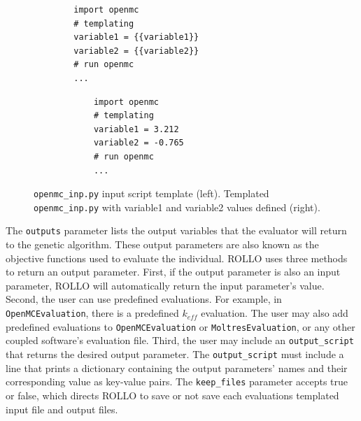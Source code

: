 \begin{figure}[]
    \begin{minipage}{0.4\textwidth}
        \centering
    \begin{verbatim}
        import openmc 
        # templating 
        variable1 = {{variable1}}
        variable2 = {{variable2}}
        # run openmc 
        ... 
    \end{verbatim}
    \end{minipage}
    \hspace{2cm}
    \begin{minipage}{0.4\textwidth}
        \centering
        \begin{verbatim}
            import openmc 
            # templating 
            variable1 = 3.212
            variable2 = -0.765
            # run openmc 
            ... 
        \end{verbatim}
        \end{minipage}
    \caption{\texttt{openmc\_inp.py} input script template (left). 
             Templated \texttt{openmc\_inp.py} with variable1 and variable2 
             values defined (right).}
    \label{fig:openmcinp.py}
\end{figure}

The \texttt{outputs} parameter lists the output variables that the evaluator 
will return to the genetic algorithm. 
These output parameters are also known as the objective functions used to 
evaluate the individual.  
\gls{ROLLO} uses three methods to return an output parameter. 
First, if the output parameter is also an input parameter, \gls{ROLLO} will automatically 
return the input parameter's value. 
Second, the user can use predefined evaluations. 
For example, in \texttt{OpenMCEvaluation}, there is a predefined $k_{eff}$ 
evaluation.
The user may also add predefined evaluations to \texttt{OpenMCEvaluation} or 
\texttt{MoltresEvaluation}, or any other coupled software's evaluation file.
Third, the user may include an \texttt{output\_script} that returns the desired 
output parameter. 
The \texttt{output\_script} must include a line that prints a dictionary containing 
the output parameters' names and their corresponding value as key-value pairs. 
The \texttt{keep\_files} parameter accepts true or false, which directs \gls{ROLLO}
to save or not save each evaluations templated input file and output files.

